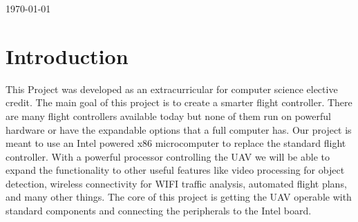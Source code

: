 \documentclass[letterpaper,10pt,notitlepage,fleqn]{article}
\begin{document}
\begin{titlepage}


{\large \today}\\[3cm] %




\vfill %



\end{titlepage}

\tableofcontents
\newpage

\section{Introduction}
\indent This Project was developed as an extracurricular for computer science elective credit.  The main goal of this project is to create a smarter flight controller. There are many flight controllers available today but none of them run on powerful hardware or have the expandable options that a full computer has. Our project is meant to use an Intel powered x86 microcomputer to replace the standard flight controller. With a powerful processor controlling the UAV we will be able to expand the functionality to other useful features like video processing for object detection, wireless connectivity for WIFI traffic analysis, automated flight plans, and many other things. The core of this project is getting the UAV operable with standard components and connecting the peripherals to the Intel board. 
\end{document}
